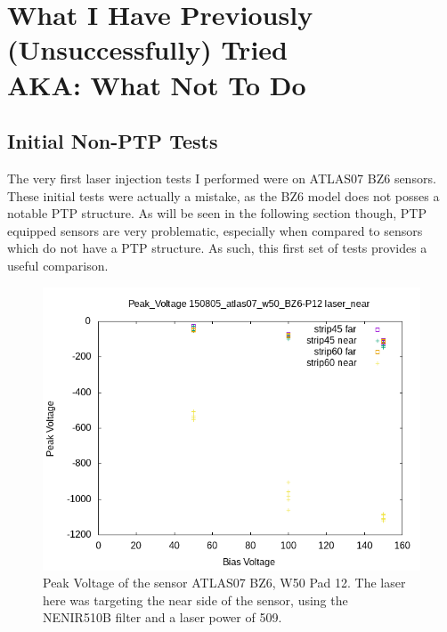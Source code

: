 \documentclass{report}
\begin{document}
            



    \chapter{ What I Have Previously (Unsuccessfully) Tried\\ AKA: What Not To Do }
        \section{Initial Non-PTP Tests}
            The very first laser injection tests I performed were on ATLAS07 BZ6 sensors. These initial tests were actually a mistake, as the BZ6 model does not posses a notable PTP structure. As will be seen in the following section though, PTP equipped sensors are very problematic, especially when compared to sensors which do not have a PTP structure. As such, this first set of tests provides a useful comparison.

            \begin{figure}[h] 
                \includegraphics[height=.4\textheight]{Peak_Voltage__150805_atlas07_w50_BZ6-P12__laser_near}
                \centering
                \caption{ Peak Voltage of the sensor ATLAS07 BZ6, W50 Pad 12. The laser here was targeting the near side of the sensor, using the NENIR510B filter and a laser power of 509. }
                \label{fig:Peak_Voltage__150805_atlas07_w50_BZ6-P12__laser_near}
            \end{figure}
\end{document}
